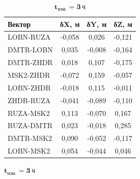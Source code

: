 \begin{table} [htbp]
{\begin{subtable}{.47\linewidth}
\begin{tabular}{ l
					S[table-number-alignment = center]
					S[table-number-alignment = center]
					S[table-number-alignment = center] }
				
				\hline
				\textbf{Вектор}				& \textbf{δX, м}	& \textbf{δY, м}	& \textbf{δZ, м}	\\ \hline
				LOBN-RUZA					&     -0,058		& 	   0,026		&     -0,121		\\ %
				DMTR-LOBN					&      0,035		&     -0,008		&     -0,164		\\ %
				DMTR-ZHDR					&      0,018		&      0,107		&     -0,175		\\ %
				MSK2-ZHDR					&     -0,072		&      0,159		&     -0,057		\\ %
				LOBN-ZHDR					&     -0,018		&      0,115		&     -0,011		\\ %
				ZHDR-RUZA					&     -0,041		&     -0,089		&     -0,110		\\ %
				RUZA-MSK2					&      0,113		&     -0,070		&      0,167		\\ %
				RUZA-DMTR					&      0,023		&     -0,018		&      0,285		\\ %
				DMTR-MSK2					&      0,090		&     -0,052		&     -0,117		\\ %
				LOBN-MSK2					&      0,054		&     -0,044		&      0,046		\\ \hline
				
				
			\end{tabular}
		\end{subtable}%
		
		\vspace{12pt}
		
		\begin{subtable}{.47\linewidth}	
			\centering
			\caption*{$\mathbf{t_\text{изм.}=3\,\text{ч}}$}
			\begin{tabular}{ l
					S[table-number-alignment = center]
					S[table-number-alignment = center]
					S[table-number-alignment = center] }
				

\end{tabular}
\end{subtable}}
\end{table}
